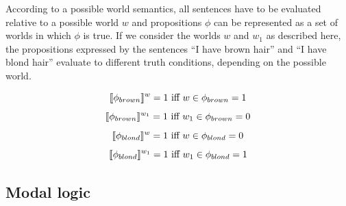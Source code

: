 According to  a possible world semantics, all sentences have to be evaluated relative to a possible world $w$ and
propositions $\phi$ can be represented as a set of worlds in which $\phi$ is true. If we consider the worlds $w$ and $w_1$ as described here,
the propositions expressed by the sentences ``I have brown hair'' and ``I have blond hair'' evaluate to different truth conditions, depending on the possible world.

$$\llbracket\phi_{brown}\rrbracket^w = 1 \mbox{ iff } w \in \phi_{brown}  = 1$$
$$\llbracket\phi_{brown}\rrbracket^{w_1} = 1 \mbox{ iff } w_1 \in \phi_{brown}  = 0$$
$$\llbracket\phi_{blond}\rrbracket^{w} = 1\mbox{ iff } w \in \phi_{blond} = 0$$
$$\llbracket\phi_{blond}\rrbracket^{w_1} = 1 \mbox{ iff } w_1 \in \phi_{blond} = 1$$

















\subsection{Modal logic}

